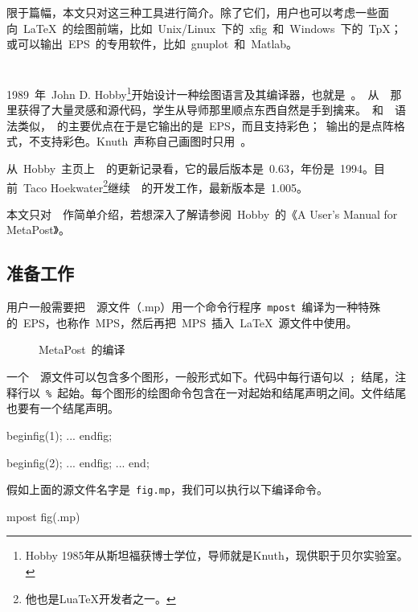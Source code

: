 限于篇幅，本文只对这三种工具进行简介。除了它们，用户也可以考虑一些面向~\LaTeX~的绘图前端，比如~Unix/Linux~下的~xfig~和~Windows~下的~TpX；或可以输出~EPS~的专用软件，比如~gnuplot~和~Matlab。

\section{\MP}
\label{sec:mp}

1989~年~John D. Hobby\footnote{Hobby 1985年从斯坦福获博士学位，导师就是Knuth，现供职于贝尔实验室。}开始设计一种绘图语言及其编译器，也就是~\MP。\MP~从~\MF~那里获得了大量灵感和源代码，学生从导师那里顺点东西自然是手到擒来。\MP~和~\MF~语法类似，\MP~的主要优点在于是它输出的是~EPS，而且支持彩色；\MF~输出的是点阵格式，不支持彩色。Knuth~声称自己画图时只用~\MP。

从~Hobby~主页上~\MP~的更新记录看，它的最后版本是~0.63，年份是~1994。目前~Taco Hoekwater\footnote{他也是LuaTeX开发者之一。}继续~\MP~的开发工作，最新版本是~1.005。

本文只对~\MP~作简单介绍，若想深入了解请参阅~Hobby~的《A User's Manual for MetaPost》\citep{Hobby_2007}。

\subsection{准备工作}
用户一般需要把~\MP~源文件（.mp）用一个命令行程序~\verb|mpost|~编译为一种特殊的~EPS，也称作~MPS，然后再把~MPS~插入~\LaTeX~源文件中使用。
\begin{figure}[htbp]
\centering
{}
\caption{MetaPost~的编译}
\label{fig:mp}
\end{figure}

一个~\MP~源文件可以包含多个图形，一般形式如下。代码中每行语句以~\verb|;|~结尾，注释行以~\verb|%|~起始。每个图形的绘图命令包含在一对起始和结尾声明之间。文件结尾也要有一个结尾声明。
\begin{code}
beginfig(1); %
...          %
endfig;      %

beginfig(2);
...
endfig;
...
end;         %
\end{code}

假如上面的源文件名字是~\verb|fig.mp|，我们可以执行以下编译命令。
\begin{code}
mpost fig(.mp)
\end{code}

